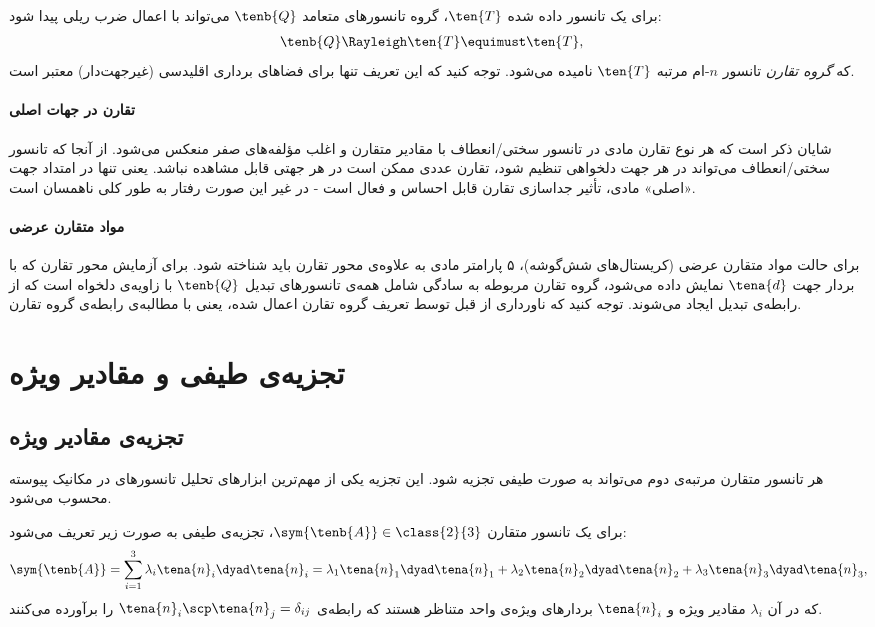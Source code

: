 \begin{definition}
    برای یک تانسور داده شده $\ten{T}$، گروه تانسورهای متعامد $\tenb{Q}$ می‌تواند با اعمال ضرب ریلی پیدا شود:
    \begin{alignat}{3}\label{eq:sym_group}
         & \tenb{Q} \Rayleigh \ten{T} \equimust\ten{T},
    \end{alignat}
    که \textit{گروه تقارن} تانسور $n$-ام مرتبه $\ten{T}$ نامیده می‌شود. توجه کنید که این تعریف تنها برای فضاهای برداری اقلیدسی (غیرجهت‌دار) معتبر است.
\end{definition}

\paragraph{تقارن در جهات اصلی} شایان ذکر است که هر نوع تقارن مادی در تانسور سختی/انعطاف با مقادیر متقارن و اغلب مؤلفه‌های صفر منعکس می‌شود. از آنجا که تانسور سختی/انعطاف می‌تواند در هر جهت دلخواهی تنظیم شود، تقارن عددی ممکن است در هر جهتی قابل مشاهده نباشد. یعنی تنها در امتداد جهت «اصلی» مادی، تأثیر جداسازی تقارن قابل احساس و فعال است - در غیر این صورت رفتار به طور کلی ناهمسان است.

\paragraph{مواد متقارن عرضی} برای حالت مواد متقارن عرضی (کریستال‌های شش‌گوشه)، ۵ پارامتر مادی به علاوه‌ی محور تقارن باید شناخته شود. برای آزمایش محور تقارن که با بردار جهت $\tena{d}$ نمایش داده می‌شود، گروه تقارن مربوطه به سادگی شامل همه‌ی تانسورهای تبدیل $\tenb{Q}$ با زاویه‌ی دلخواه است که از رابطه‌ی تبدیل ایجاد می‌شوند. توجه کنید که ناورداری از قبل توسط تعریف گروه تقارن اعمال شده، یعنی با مطالبه‌ی رابطه‌ی گروه تقارن.

\section{تجزیه‌ی طیفی و مقادیر ویژه}

\subsection{تجزیه‌ی مقادیر ویژه}
هر تانسور متقارن مرتبه‌ی دوم می‌تواند به صورت طیفی تجزیه شود. این تجزیه یکی از مهم‌ترین ابزارهای تحلیل تانسورهای در مکانیک پیوسته محسوب می‌شود.

\begin{definition}
    برای یک تانسور متقارن $\sym{\tenb{A}}\in\class{2}{3}$، تجزیه‌ی طیفی به صورت زیر تعریف می‌شود:
    \begin{equation}
        \sym{\tenb{A}} = \sum_{i=1}^{3} \lambda_i \tena{n}_i \dyad \tena{n}_i = \lambda_1 \tena{n}_1 \dyad \tena{n}_1 + \lambda_2 \tena{n}_2 \dyad \tena{n}_2 + \lambda_3 \tena{n}_3 \dyad \tena{n}_3,
    \end{equation}
    که در آن $\lambda_i$ مقادیر ویژه و $\tena{n}_i$ بردارهای ویژه‌ی واحد متناظر هستند که رابطه‌ی $\tena{n}_i \scp \tena{n}_j = \delta_{ij}$ را برآورده می‌کنند.
\end{definition}

